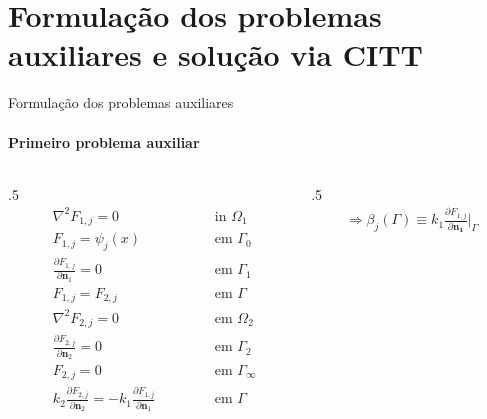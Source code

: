 \documentclass{beamer}
\begin{document}
\section{Formulação dos problemas auxiliares e solução via CITT}
\begin{frame}{Formulação dos problemas auxiliares}
	\framesubtitle{Primeiro problema auxiliar}
	\begin{columns}
	\begin{column}{.5\textwidth}
	\begin{subequations}
		\begin{alignat*}{2}
		& \nabla^2 F_{1,j} = 0 \quad\quad\quad\quad && \text{ in } \Omega_1  \\
		& F_{1,j} = \psi_j(x) && \text{ em } \Gamma_0   \\
		& \frac{\partial F_{1,j}}{\partial \mathbf{n}_1} = 0 && \text{ em }  \Gamma_1  \\ 
		& F_{1,j} = F_{2, j} \quad\quad\quad\quad\quad && \text{ em }  \Gamma \\
		& \nabla^2 F_{2,j} = 0 && \text{ em }  \Omega_2 \\
		& \frac{\partial F_{2,j}}{\partial \mathbf{n}_2} = 0 && \text{ em }  \Gamma_2 \\
		& F_{2,j} = 0 && \text{ em }  \Gamma_\infty \\
		& k_2\frac{\partial F_{2, j}}{\partial\mathbf{n}_2} = - k_1\frac{\partial F_{1,j}}{\partial\mathbf{n}_1} && \text{ em }  \Gamma 
		\end{alignat*}
	\end{subequations}
	\end{column}
	
	\begin{column}{.5\textwidth}
		\begin{align*}
		\Rightarrow \beta_j(\Gamma) \equiv k_1 \frac{\partial F_{1,j}}{\partial\mathbf{n_1}}\bigg|_\Gamma
		\end{align*}
	\end{column}
	\end{columns}
	
	\begin{center}
	\end{center}
\end{frame}
\end{document}
